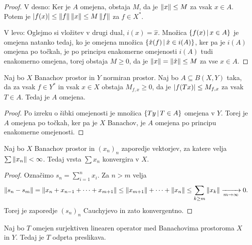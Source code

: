 \begin{proof}
  V desno:
  Ker je $A$ omejena, obstaja $M$, da je $\left\lVert x\right\rVert \le M$ za vsak $x \in A$.
  Potem je $\left| f(x) \right| \le \left\lVert f\right\rVert \left\lVert x\right\rVert \le M \left\lVert f\right\rVert$ za $f \in X^*$.

  V levo:
  Oglejmo si vložitev v drugi dual, $i(x) = \hat{x}$.
  Množica $\{f(x) \,|\, x \in A\}$ je omejena natanko tedaj, ko je omejena
  množica $\{\hat{x}(f) \,|\, \hat{x} \in i(A)\}$, ker pa je $i(A)$ omejena po
  točkah, je po principu enakomerne omejenosti $i(A)$ tudi enakomerno omejena,
  torej obstaja $M \ge 0$, da je $\left\lVert x\right\rVert = \left\lVert\hat{x}\right\rVert \le M$ za vse $x \in
  A$.
\end{proof}


\begin{posledica}
  Naj bo $X$ Banachov prostor in $Y$ normiran prostor.
  Naj bo $A \subseteq B(X,Y)$ taka, da za vsak $f \in Y^*$ in vsak $x \in X$
  obstaja $M_{f,x} \ge 0$, da je $\left| f(Tx) \right| \le M_{f,x}$ za vsak $T \in A$.
  Tedaj je $A$ omejena.
\end{posledica}

\begin{proof}
  Po izreku o šibki omejenosti je množica $\{Ty \,|\, T \in A\}$ omejena v $Y$.
  Torej je $A$ omejena po točkah, ker pa je $X$ Banachov, je $A$ omejena po
  principu enakomerne omejenosti.
\end{proof}

\begin{lema}
  Naj bo $X$ Banachov prostor in $(x_n)_n$ zaporedje vektorjev, za katere velja
  $\sum \left\lVert x_n\right\rVert < \infty$.
  Tedaj vrsta $\sum x_n$ konvergira v $X$.
\end{lema}

\begin{proof}
  Označimo $s_n = \sum_{i=1}^n x_i$.
  Za $n > m$ velja
  \[
	\left\lVert s_n - s_m\right\rVert = \left\lVert x_n + x_{n-1} + \cdots + x_{m+1}\right\rVert
	\le \left\lVert x_{m+1}\right\rVert + \cdots + \left\lVert x_n\right\rVert
	\le \sum_{k \ge m} \left\lVert x_k\right\rVert
	\xrightarrow[m \to \infty]{} 0.
  \]
  Torej je zaporedje $(s_n)_n$ Cauchyjevo in zato konvergentno.
\end{proof}

\begin{izrek}
  Naj bo $T$ omejen surjektiven linearen operator med Banachovima prostoroma $X$
  in $Y$.
  Tedaj je $T$ odprta preslikava.
\end{izrek}

